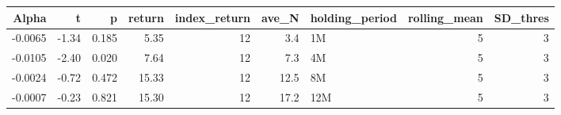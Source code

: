 \begin{table}[ht]
\centering
\begin{tabular}{rrrrrrlrr}
  \hline
Alpha & t & p & return & index\_return & ave\_N & holding\_period & rolling\_mean & SD\_thres \\ 
  \hline
-0.0065 & -1.34 & 0.185 & 5.35 & 12 & 3.4 & 1M &  5 &  3 \\ 
  -0.0105 & -2.40 & 0.020 & 7.64 & 12 & 7.3 & 4M &  5 &  3 \\ 
  -0.0024 & -0.72 & 0.472 & 15.33 & 12 & 12.5 & 8M &  5 &  3 \\ 
  -0.0007 & -0.23 & 0.821 & 15.30 & 12 & 17.2 & 12M &  5 &  3 \\ 
   \hline
\end{tabular}
\end{table}

